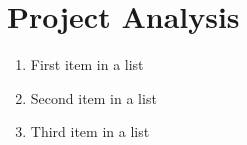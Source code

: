 \section{Project Analysis}

\lipsum[5] %

\begin{enumerate}[noitemsep] %
    \item First item in a list
    \item Second item in a list
    \item Third item in a list
\end{enumerate}

